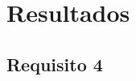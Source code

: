 \documentclass{bmvc2k}
\begin{document}
%
%
%



\section{Resultados}
\label{sec:Results}


\subsection{Requisito 4}
\label{res:Req4}
\end{document}
